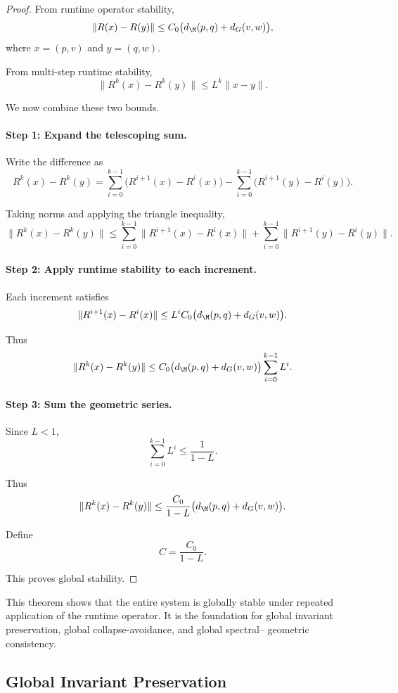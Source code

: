 \begin{proof}
From runtime operator stability,
\[
\|R(x) - R(y)\|
\le
C_0\big(d_\M(p,q) + d_G(v,w)\big),
\]
where $x = (p,v)$ and $y = (q,w)$.

From multi-step runtime stability,
\[
\|R^k(x) - R^k(y)\|
\le
L^k \|x - y\|.
\]

We now combine these two bounds.

\paragraph{Step 1: Expand the telescoping sum.}
Write the difference as
\[
R^k(x) - R^k(y)
=
\sum_{i=0}^{k-1}
\big(R^{i+1}(x) - R^i(x)\big)
-
\sum_{i=0}^{k-1}
\big(R^{i+1}(y) - R^i(y)\big).
\]

Taking norms and applying the triangle inequality,
\[
\|R^k(x) - R^k(y)\|
\le
\sum_{i=0}^{k-1}
\|R^{i+1}(x) - R^i(x)\|
+
\sum_{i=0}^{k-1}
\|R^{i+1}(y) - R^i(y)\|.
\]

\paragraph{Step 2: Apply runtime stability to each increment.}
Each increment satisfies
\[
\|R^{i+1}(x) - R^i(x)\|
\le
L^i C_0\big(d_\M(p,q) + d_G(v,w)\big).
\]

Thus
\[
\|R^k(x) - R^k(y)\|
\le
C_0\big(d_\M(p,q) + d_G(v,w)\big)
\sum_{i=0}^{k-1} L^i.
\]

\paragraph{Step 3: Sum the geometric series.}
Since $L < 1$,
\[
\sum_{i=0}^{k-1} L^i
\le
\frac{1}{1-L}.
\]

Thus
\[
\|R^k(x) - R^k(y)\|
\le
\frac{C_0}{1-L}
\big(d_\M(p,q) + d_G(v,w)\big).
\]

Define
\[
C = \frac{C_0}{1-L}.
\]

This proves global stability.
\end{proof}

\begin{remark}
This theorem shows that the entire system is globally stable under repeated
application of the runtime operator. It is the foundation for global
invariant preservation, global collapse-avoidance, and global spectral--
geometric consistency.
\end{remark}

\subsection{Global Invariant Preservation}


